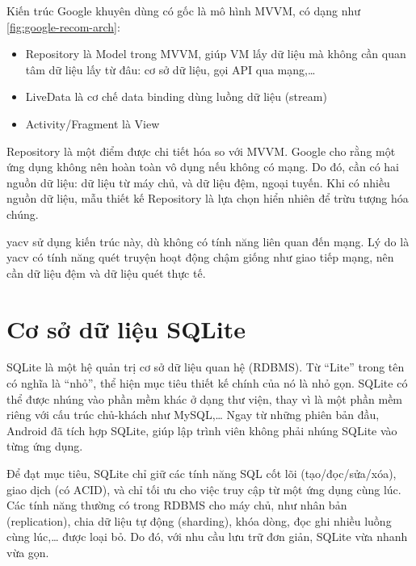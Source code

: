 \documentclass[../../thesis]{subfiles}
\begin{document}
Kiến trúc Google khuyên dùng có gốc là mô hình MVVM, có dạng như
\autoref{fig:google-recom-arch}:

\begin{itemize}
    \item
        Repository là Model trong MVVM, giúp VM lấy dữ liệu mà không cần quan
        tâm dữ liệu lấy từ đâu: cơ sở dữ liệu, gọi API qua mạng,\ldots
    \item
        LiveData là cơ chế data binding dùng luồng dữ liệu (stream)
    \item
        Activity/Fragment là View
\end{itemize}

Repository là một điểm được chi tiết hóa so với MVVM. Google cho rằng một ứng
dụng không nên hoàn toàn vô dụng nếu không có mạng. Do đó, cần có hai nguồn dữ
liệu: dữ liệu từ máy chủ, và dữ liệu đệm, ngoại tuyến. Khi có nhiều nguồn dữ
liệu, mẫu thiết kế Repository là lựa chọn hiển nhiên để trừu tượng hóa chúng.

yacv sử dụng kiến trúc này, dù không có tính năng liên quan đến mạng. Lý do là
yacv có tính năng quét truyện hoạt động chậm giống như giao tiếp mạng, nên cần
dữ liệu đệm và dữ liệu quét thực tế.



\section{Cơ sở dữ liệu SQLite}\label{sec:sqlite}

SQLite là một hệ quản trị cơ sở dữ liệu quan hệ (RDBMS). Từ ``Lite'' trong tên
có nghĩa là ``nhỏ'', thể hiện mục tiêu thiết kế chính của nó là nhỏ gọn. SQLite
có thể được nhúng vào phần mềm khác ở dạng thư viện, thay vì là một phần mềm
riêng với cấu trúc chủ-khách như MySQL,\ldots{} Ngay từ những phiên bản đầu,
Android đã tích hợp SQLite, giúp lập trình viên không phải nhúng SQLite vào từng
ứng dụng.

Để đạt mục tiêu, SQLite chỉ giữ các tính năng SQL cốt lõi (tạo/đọc/sửa/xóa),
giao dịch (có ACID), và chỉ tối ưu cho việc truy cập từ một ứng dụng cùng lúc.
Các tính năng thường có trong RDBMS cho máy chủ, như nhân bản (replication),
chia dữ liệu tự động (sharding), khóa dòng, đọc ghi nhiều luồng cùng
lúc,\ldots{} được loại bỏ. Do đó, với nhu cầu lưu trữ đơn giản, SQLite vừa nhanh
vừa gọn.
\end{document}
